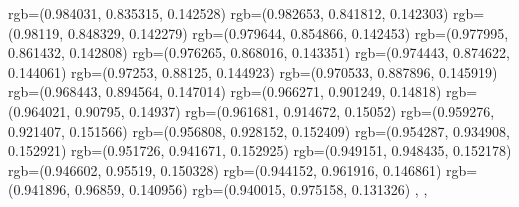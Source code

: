 {{{      rgb=(0.984031, 0.835315, 0.142528)
      rgb=(0.982653, 0.841812, 0.142303)
      rgb=(0.98119, 0.848329, 0.142279)
      rgb=(0.979644, 0.854866, 0.142453)
      rgb=(0.977995, 0.861432, 0.142808)
      rgb=(0.976265, 0.868016, 0.143351)
      rgb=(0.974443, 0.874622, 0.144061)
      rgb=(0.97253, 0.88125, 0.144923)
      rgb=(0.970533, 0.887896, 0.145919)
      rgb=(0.968443, 0.894564, 0.147014)
      rgb=(0.966271, 0.901249, 0.14818)
      rgb=(0.964021, 0.90795, 0.14937)
      rgb=(0.961681, 0.914672, 0.15052)
      rgb=(0.959276, 0.921407, 0.151566)
      rgb=(0.956808, 0.928152, 0.152409)
      rgb=(0.954287, 0.934908, 0.152921)
      rgb=(0.951726, 0.941671, 0.152925)
      rgb=(0.949151, 0.948435, 0.152178)
      rgb=(0.946602, 0.95519, 0.150328)
      rgb=(0.944152, 0.961916, 0.146861)
      rgb=(0.941896, 0.96859, 0.140956)
      rgb=(0.940015, 0.975158, 0.131326)
		},
	},
}

\endinput
